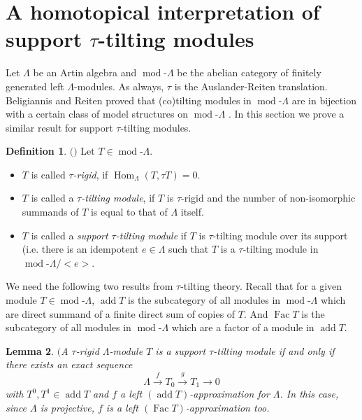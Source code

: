 \documentclass[12pt]{amsart}
\numberwithin{equation}{section}
\newtheorem{lemma}{Lemma}[section]
\theoremstyle{definition}
\newtheorem{definition}[lemma]{Definition}
\DeclareMathOperator{\modd}{mod}
\DeclareMathOperator{\add}{add}
\DeclareMathOperator{\Hom}{Hom}
\DeclareMathOperator{\Fac}{Fac}
\newtheorem*{theorem 0*}{Theorem}
\newtheorem*{theorem a*}{Theorem A}
\newtheorem*{theorem b*}{Theorem B}
\numberwithin{diagram}{section}
\begin{document}
\section{A homotopical interpretation of support $\tau$-tilting modules}
Let $\Lambda$ be an Artin algebra and $\modd\text{-}\Lambda$ be the abelian category of finitely generated left $\Lambda$-modules. As always, $\tau$ is the Auslander-Reiten translation.
Beligiannis and Reiten proved that (co)tilting modules in $\modd\text{-}\Lambda$ are in bijection with a certain class of model structures on $\modd\text{-}\Lambda$ \cite[VIII, Theorem 5.8]{BR}. In this section we prove a similar result for support $\tau$-tilting modules.
\begin{definition}$($\cite{AIR}$)$
Let $T\in\modd\text{-}\Lambda$.
\begin{itemize}
\item
$T$ is called {\it $\tau$-rigid}, if $\Hom_{\Lambda}(T,\tau T)=0$.
\item
$T$ is called a {\it $\tau$-tilting module}, if $T$ is $\tau$-rigid and the number of non-isomorphic summands of $T$ is equal to that of $\Lambda$ itself.
\item
$T$ is called a {\it support $\tau$-tilting module} if $T$ is $\tau$-tilting module over its support (i.e. there is an idempotent $e\in \Lambda$ such that $T$ is
a $\tau$-tilting module in $\modd\text{-}\Lambda/<e>$. 
\end{itemize}
\end{definition}

We need the following two results from $\tau$-tilting theory. Recall that for a given module $T\in\modd\text{-}\Lambda$, $\add T$ is the subcategory of all modules in $\modd\text{-}\Lambda$ which are direct summand of a finite direct sum of copies of $T$. And $\Fac T$ is the subcategory of all modules in $\modd\text{-}\Lambda$ which are a factor of a module in $\add T$.

\begin{lemma}$($\cite[Proposition 2.14]{J}\label{4.2}
A $\tau$-rigid $\Lambda$-module $T$ is a support $\tau$-tilting module if and only if there exists an exact sequence
\begin{equation}\label{eq4.1}
\Lambda\overset{f}{\longrightarrow}T_0\overset{g}{\longrightarrow} T_1\rightarrow 0
\end{equation}
with $T^0,T^1\in \add T$ and $f$ a left $(\add T)$-approximation for $\Lambda$. In this case, since $\Lambda$ is projective, $f$ is a left $(\Fac T)$-approximation too.
\end{lemma}
\end{document}
